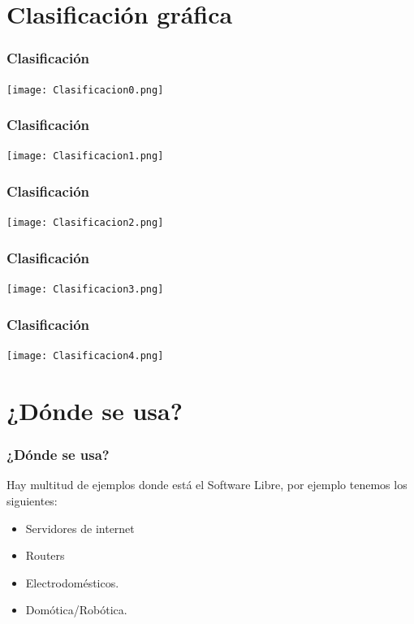 \documentclass{beamer}
\begin{document}
	\section{Clasificación gráfica}
		\begin{frame}\frametitle{Clasificación}
			\texttt{[image: Clasificacion0.png]}
		\end{frame}
		\begin{frame}\frametitle{Clasificación}
			\texttt{[image: Clasificacion1.png]}
		\end{frame}
		\begin{frame}\frametitle{Clasificación}
			\texttt{[image: Clasificacion2.png]}
		\end{frame}
		\begin{frame}\frametitle{Clasificación}
			\texttt{[image: Clasificacion3.png]}
		\end{frame}
		\begin{frame}\frametitle{Clasificación}
			\texttt{[image: Clasificacion4.png]}
		\end{frame}


	\section{¿Dónde se usa?}
		\begin{frame}
			\frametitle{¿Dónde se usa?}
			Hay multitud de ejemplos donde está el Software Libre, por ejemplo tenemos los siguientes:
			\begin{itemize}
				\item<2-> Servidores de internet
				\item<3-> Routers
				\item<4-> Electrodomésticos.
				\item<5-> Domótica/Robótica.
			\end{itemize}
		\end{frame}
\end{document}
